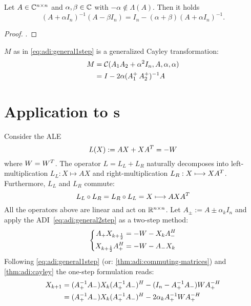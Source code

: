 \begin{lemma}
\label{thm:adi:cayley}
  Let $A\in\mathbb{C}^{n\times n}$ and $\alpha, \beta\in\mathbb{C}$ with $-\alpha\notin\Lambda(A)$.
  Then it holds
  \begin{equation*}
    (A+\alpha I_n)^{-1} (A-\beta I_n)
    =
    I_n - (\alpha + \beta)(A+\alpha I_n)^{-1}
    .
  \end{equation*}
\end{lemma}
\begin{proof}
  \cite[Proposition~2.16]{Kuerschner2016}.
\end{proof}


\begin{remark}
  $M$ as in \eqref{eq:adi:general1step} is a generalized Cayley transformation:
  \begin{align*}
    M
    &= \mathcal C(A_1A_2 + \alpha^2 I_n, A, \alpha, \alpha) \\
    &= I - 2\alpha(\mathop{A_1^+} \mathop{A_2^+})^{-1} A
  \end{align*}
\end{remark}

\section{Application to s}

Consider the \ac{ALE}
\begin{equation*}
  L(X) := AX + XA^T = -W
\end{equation*}
where $W = W^T$.
The \Lyapunov operator $L = L_L + L_R$ naturally decomposes into
left-multiplication $L_L : X \mapsto AX$ and
right-multiplication $L_R : X \longmapsto XA^T$.
Furthermore, $L_L$ and $L_R$ commute:
\begin{equation*}
  L_L \circ L_R = L_R \circ L_L = X \longmapsto AXA^T
\end{equation*}
All the operators above are linear and act on $\mathbb{R}^{n\times n}$.
Let $A_\pm := A \pm \alpha_k I_n$ and
apply the \ac{ADI}~\eqref{eq:adi:general2step} as a two-step method:
\begin{equation}
  \left\{
  \begin{aligned}
    A_+ X_{k+\frac{1}{2}} &= -W - X_k A_-^H \\
    X_{k+\frac{1}{2}} A_+^H &= -W - A_- X_k
  \end{aligned}
  \right.
\end{equation}
Following \eqref{eq:adi:general1step}
(or: \autoref{thm:adi:commuting-matrices})
and \autoref{thm:adi:cayley}
the one-step formulation reads:
\begin{align*}
  X_{k+1}
  &= (A_+^{-1} A_-) X_k (A_+^{-1} A_-)^H
  - (I_n - A_+^{-1} A_-) W A_+^{-H}
  \\
  &= (A_+^{-1} A_-) X_k (A_+^{-1} A_-)^H
  - 2\alpha_k A_+^{-1} W A_+^{-H}
\end{align*}

